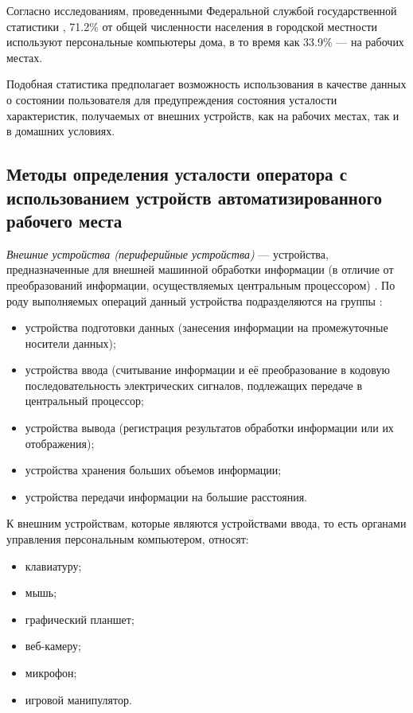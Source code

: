 Согласно исследованиям, проведенными Федеральной службой государственной статистики \cite{rosstatInvestigation}, 71.2\% от общей численности населения в городской местности используют персональные компьютеры дома, в то время как 33.9\% --- на рабочих местах.

Подобная статистика предполагает возможность использования в качестве данных о состоянии пользователя для предупреждения состояния усталости характеристик, получаемых от внешних устройств, как на рабочих местах, так и в домашних условиях.

\subsection{Методы определения усталости оператора с использованием ус\-тройств автоматизированного рабочего места}
\textit{Внешние устройства (периферийные устройства)} --- устройства, предназначенные для внешней машинной обработки информации (в отличие от преобразований информации, осуществляемых центральным процессором) \cite{polytechDic}. По роду выполняемых операций данный устройства подразделяются на группы \cite{polytechDic}: 
\begin{itemize}[leftmargin=1.6\parindent]
\item устройства подготовки данных (занесения информации на промежуточные носители данных);
\item устройства ввода (считывание информации и её преобразование в кодовую последовательность электрических сигналов, подлежащих передаче в центральный процессор;
\item устройства вывода (регистрация результатов обработки информации или их отображения);
\item устройства хранения больших объемов информации;
\item устройства передачи информации на большие расстояния.
\end{itemize}

К внешним устройствам, которые являются устройствами ввода, то есть органами управления персональным компьютером, относят:
\begin{itemize}[leftmargin=1.6\parindent]
\item клавиатуру;
\item мышь;
\item графический планшет;
\item веб-камеру;
\item микрофон;
\item игровой манипулятор.
\end{itemize}

